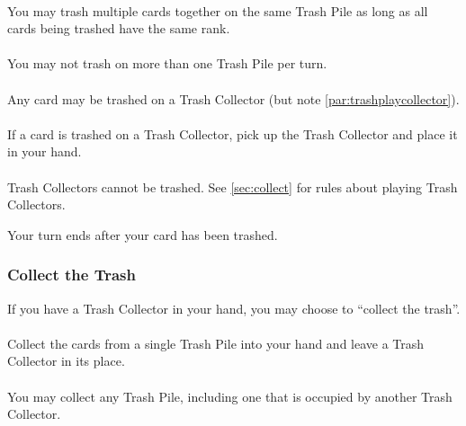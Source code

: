 \documentclass{article}
\begin{document}
\paragraph{} \label{par:trashmultiple}
You may trash multiple cards together on the same Trash Pile as long as all cards being trashed have the same rank.

\paragraph{} \label{par:trashmultiplepiles}
You may not trash on more than one Trash Pile per turn.

\paragraph{} \label{par:trashwild}
Any card may be trashed on a Trash Collector (but note \autoref{par:trashplaycollector}).

\paragraph{} \label{par:trashplayoncollector}
If a card is trashed on a Trash Collector, pick up the Trash Collector and place it in your hand.

\paragraph{} \label{par:trashplaycollector}
Trash Collectors cannot be trashed. See \autoref{sec:collect} for rules about playing Trash Collectors.

Your turn ends after your card has been trashed.

\subsubsection{Collect the Trash}
\label{sec:collect}

If you have a Trash Collector in your hand, you may choose to ``collect the trash''.

\paragraph{} \label{par:collectplay}
Collect the cards from a single Trash Pile into your hand and leave a Trash Collector in its place.

\paragraph{} \label{par:collectcollector}
You may collect any Trash Pile, including one that is occupied by another Trash Collector.
\end{document}
